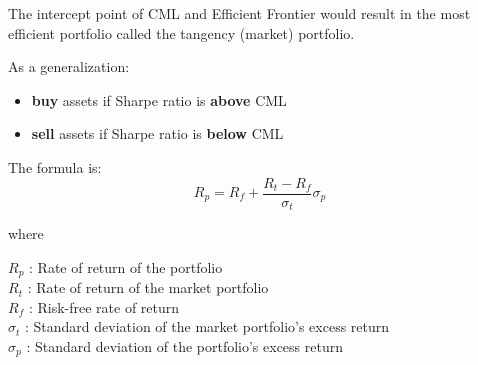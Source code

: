 \documentclass{beamer}
\begin{document}
\begin{frame}

\justifying
The intercept point of CML and Efficient Frontier would result in the most efficient portfolio called the tangency (market) portfolio.

\vspace{0.2cm}
\justifying
As a generalization:
\begin{itemize}
	\justifying
	\item \textbf{buy} assets if Sharpe ratio is \textbf{above} CML
	\item \textbf{sell} assets if Sharpe ratio is \textbf{below} CML
\end{itemize}

\vspace{0.2cm}
\begin{block}
\justifying
The formula is:
$$
R_{p} = R_{f} + \frac{R_{t} - R_{f}}{\sigma_{t}} \sigma_{p}
$$
\end{block}

\vspace{0.2cm}
\justifying
where

\vspace{0.2cm}
\justifying
$R_{p}$ : Rate of return of the portfolio\\
$R_{t}$ : Rate of return of the market portfolio\\
$R_{f}$ : Risk-free rate of return\\
$\sigma_{t}$ : Standard deviation of the market portfolio's excess return\\
$\sigma_{p}$ : Standard deviation of the portfolio's excess return

\end{frame}
\end{document}
